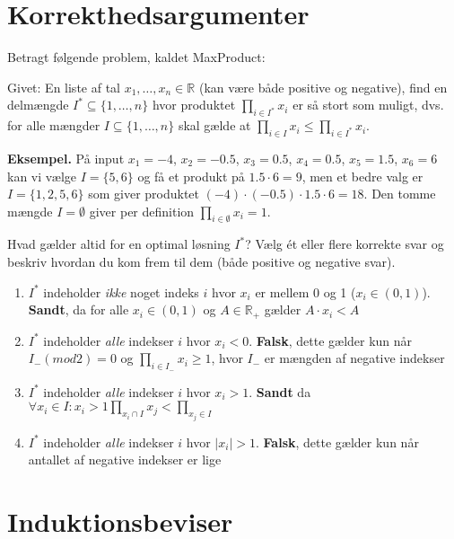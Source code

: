 \documentclass{article}
\theoremstyle{definition}
\begin{document}
\section{Korrekthedsargumenter}

Betragt følgende problem, kaldet MaxProduct:

Givet: En liste af tal $x_1,\ldots,x_n \in \mathbb{R}$ (kan være både positive og negative), find en delmængde $I^* \subseteq \{1,\ldots,n\}$ hvor produktet $\prod_{i\in I^*} x_i$ er så stort som muligt, dvs. for alle mængder $I \subseteq \{1,\ldots,n\}$ skal gælde at $\prod_{i\in I} x_i \leq \prod_{i\in I^*} x_i$.

\textbf{Eksempel.} På input $x_1 = -4$, $x_2 = -0.5$, $x_3 = 0.5$, $x_4 = 0.5$, $x_5 = 1.5$, $x_6 = 6$ kan vi vælge $I = \{5,6\}$ og få et produkt på $1.5 \cdot 6 = 9$, men et bedre valg er $I = \{1,2,5,6\}$ som giver produktet $(-4) \cdot (-0.5) \cdot 1.5 \cdot 6 = 18$. Den tomme mængde $I = \emptyset$ giver per definition $\prod_{i\in\emptyset} x_i = 1$.

Hvad gælder altid for en optimal løsning $I^*$? Vælg ét eller flere korrekte svar og beskriv hvordan du kom frem til dem (både positive og negative svar).

\begin{enumerate}
    \item $I^*$ indeholder \textit{ikke} noget indeks $i$ hvor $x_i$ er mellem 0 og 1 ($x_i \in (0,1)$). 
    \textbf{Sandt}, da for alle $x_i \in (0,1)$ og $A \in \mathbb{R}_+$ gælder $A \cdot x_i < A$
    
    \item $I^*$ indeholder \textit{alle} indekser $i$ hvor $x_i < 0$. 
    \textbf{Falsk}, dette gælder kun når $I_- (mod 2) = 0$  og $\prod_{i \in I_-} x_i \geq 1$, hvor $I_-$ er mængden af negative indekser
    
    \item $I^*$ indeholder \textit{alle} indekser $i$ hvor $x_i > 1$. 
    \textbf{Sandt} da $\forall x_i \in I: x_i > 1 \prod_{x_i \cap I} x_j < \prod_{x_j \in I}$
    
    \item $I^*$ indeholder \textit{alle} indekser $i$ hvor $|x_i| > 1$. 
    \textbf{Falsk}, dette gælder kun når antallet af negative indekser er lige
\end{enumerate}

\section{Induktionsbeviser}
\end{document}
